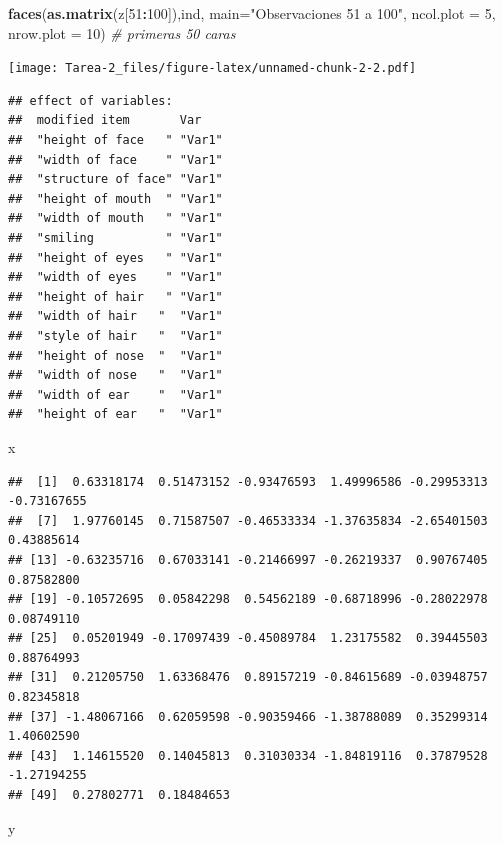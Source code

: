 \documentclass[
]{article}
\newenvironment{Shaded}{\begin{snugshade}}{\end{snugshade}}
\newcommand{\CommentTok}[1]{\textcolor[rgb]{0.56,0.35,0.01}{\textit{#1}}}
\newcommand{\DataTypeTok}[1]{\textcolor[rgb]{0.13,0.29,0.53}{#1}}
\newcommand{\DecValTok}[1]{\textcolor[rgb]{0.00,0.00,0.81}{#1}}
\newcommand{\KeywordTok}[1]{\textcolor[rgb]{0.13,0.29,0.53}{\textbf{#1}}}
\newcommand{\NormalTok}[1]{#1}
\newcommand{\OperatorTok}[1]{\textcolor[rgb]{0.81,0.36,0.00}{\textbf{#1}}}
\newcommand{\StringTok}[1]{\textcolor[rgb]{0.31,0.60,0.02}{#1}}
\begin{document}
\begin{Shaded}
\begin{Highlighting}[]
  \KeywordTok{faces}\NormalTok{(}\KeywordTok{as.matrix}\NormalTok{(z[}\DecValTok{51}\OperatorTok{:}\DecValTok{100}\NormalTok{]),ind, }\DataTypeTok{main=}\StringTok{"Observaciones 51 a 100"}\NormalTok{, }\DataTypeTok{ncol.plot =} \DecValTok{5}\NormalTok{, }\DataTypeTok{nrow.plot =} \DecValTok{10}\NormalTok{) }\CommentTok{# primeras 50 caras}
\end{Highlighting}
\end{Shaded}

\texttt{[image: Tarea-2\_files/figure-latex/unnamed-chunk-2-2.pdf]}

\begin{verbatim}
## effect of variables:
##  modified item       Var   
##  "height of face   " "Var1"
##  "width of face    " "Var1"
##  "structure of face" "Var1"
##  "height of mouth  " "Var1"
##  "width of mouth   " "Var1"
##  "smiling          " "Var1"
##  "height of eyes   " "Var1"
##  "width of eyes    " "Var1"
##  "height of hair   " "Var1"
##  "width of hair   "  "Var1"
##  "style of hair   "  "Var1"
##  "height of nose  "  "Var1"
##  "width of nose   "  "Var1"
##  "width of ear    "  "Var1"
##  "height of ear   "  "Var1"
\end{verbatim}

\begin{Shaded}
\begin{Highlighting}[]
\NormalTok{  x}
\end{Highlighting}
\end{Shaded}

\begin{verbatim}
##  [1]  0.63318174  0.51473152 -0.93476593  1.49996586 -0.29953313 -0.73167655
##  [7]  1.97760145  0.71587507 -0.46533334 -1.37635834 -2.65401503  0.43885614
## [13] -0.63235716  0.67033141 -0.21466997 -0.26219337  0.90767405  0.87582800
## [19] -0.10572695  0.05842298  0.54562189 -0.68718996 -0.28022978  0.08749110
## [25]  0.05201949 -0.17097439 -0.45089784  1.23175582  0.39445503  0.88764993
## [31]  0.21205750  1.63368476  0.89157219 -0.84615689 -0.03948757  0.82345818
## [37] -1.48067166  0.62059598 -0.90359466 -1.38788089  0.35299314  1.40602590
## [43]  1.14615520  0.14045813  0.31030334 -1.84819116  0.37879528 -1.27194255
## [49]  0.27802771  0.18484653
\end{verbatim}

\begin{Shaded}
\begin{Highlighting}[]
\NormalTok{  y}
\end{Highlighting}
\end{Shaded}
\end{document}
